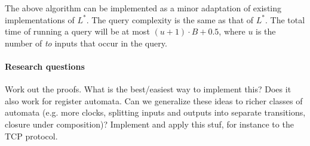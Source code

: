 The above algorithm can be implemented as a minor adaptation of existing implementations of $L^{\ast}$. The query
complexity is the same as that of $L^{\ast}$. The total time of running a query will be at most $(u+1) \cdot B + 0.5$,
where $u$ is the number of \emph{to} inputs that occur in the query.

\paragraph{Research questions}
Work out the proofs. What is the best/easiest way to implement this?
Does it also work for register automata.
Can we generalize these ideas to richer classes of automata (e.g. more clocks, splitting inputs and outputs into separate
transitions, closure under composition)?
Implement and apply this stuf, for instance to the TCP protocol.